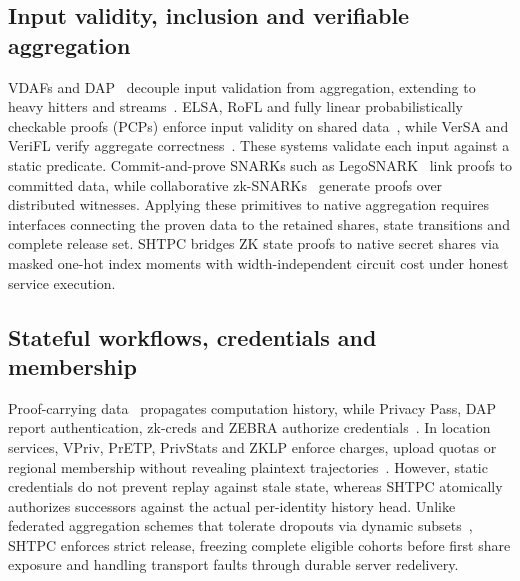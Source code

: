 \documentclass[conference,compsoc]{IEEEtran}
\theoremstyle{definition}
\numberwithin{equation}{section}
\numberwithin{table}{section}
\numberwithin{figure}{section}
\theoremstyle{plain}
\begin{document}
\subsection{Input validity, inclusion and verifiable aggregation}
VDAFs and DAP~\cite{Addanki2022PrioPlus,Barnes2023VDAF08,Geoghegan2026DAP,Davis2023VDAFPrivacy} decouple input validation from aggregation, extending to heavy hitters and streams~\cite{Boneh2021Poplar,Mouris2025Mastic,Rathee2024Whisper}. ELSA, RoFL and fully linear probabilistically checkable proofs (PCPs) enforce input validity on shared data~\cite{Rathee2023ELSA,Lycklama2023RoFL,Boneh2019FullyLinear}, while VerSA and VeriFL verify aggregate correctness~\cite{Hahn2023VerSA,Luo2024VerSAComments,Guo2021VeriFL,Guo2022VeriFLFix}. These systems validate each input against a static predicate. Commit-and-prove SNARKs such as LegoSNARK~\cite{Campanelli2019LegoSNARK} link proofs to committed data, while collaborative zk-SNARKs~\cite{Ozdemir2022Collaborative} generate proofs over distributed witnesses. Applying these primitives to native aggregation requires interfaces connecting the proven data to the retained shares, state transitions and complete release set. SHTPC bridges ZK state proofs to native secret shares via masked one-hot index moments with width-independent circuit cost under honest service execution.

\subsection{Stateful workflows, credentials and membership}
Proof-carrying data~\cite{Chiesa2010PCD,Bitansky2012Recursive} propagates computation history, while Privacy Pass, DAP report authentication, zk-creds and ZEBRA authorize credentials~\cite{Davidson2024PrivacyPass,Priebe2023ReportAuth,Rosenberg2023ZKCreds,Rathee2022Zebra}. In location services, VPriv, PrETP, PrivStats and ZKLP enforce charges, upload quotas or regional membership without revealing plaintext trajectories~\cite{Popa2009VPriv,Balasch2010PrETP,Popa2011PrivStats,Ernstberger2025ZKLP}. However, static credentials do not prevent replay against stale state, whereas SHTPC atomically authorizes successors against the actual per-identity history head. Unlike federated aggregation schemes that tolerate dropouts via dynamic subsets~\cite{Bonawitz2017SecureAggregation,Ma2023Flamingo,Bell2020SecAggPlus,So2022LightSecAgg}, SHTPC enforces strict release, freezing complete eligible cohorts before first share exposure and handling transport faults through durable server redelivery.
\end{document}
